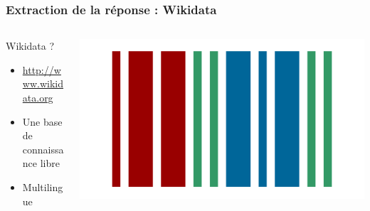 \begin{frame}
   \frametitle{Extraction de la réponse : Wikidata}

    \begin{columns}
    \begin{column}{0.55\textwidth}
     Wikidata ?
    \begin{itemize}
        \item \alert{\url{http://www.wikidata.org}}
        \item Une base de \alert{connaissance libre}
        \item \alert{Multilingue}
    \end{itemize}
    \end{column}
    \begin{column}{0.5\textwidth}
        \includegraphics[width=\linewidth]{figures/Wikidata-logo.png}
    \end{column}
    \end{columns}
\end{frame}

